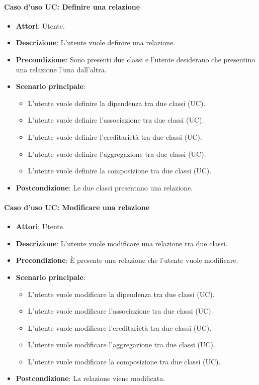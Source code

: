 \paragraph{Caso d'uso UC: Definire una relazione}
\begin{itemize}
	\item\textbf{Attori}: Utente.
	\item\textbf{Descrizione}: L'utente vuole definire una relazione.
	\item\textbf{Precondizione}: Sono presenti due classi e l'utente desiderano che presentino una relazione l'una dall'altra.
	\item\textbf{Scenario principale}: 
		\begin{itemize}
			\item L'utente vuole definire la dipendenza tra due classi (UC).
			\item L'utente vuole definire l'associazione tra due classi (UC).
			\item L'utente vuole definire l'ereditarietà tra due classi (UC).
			\item L'utente vuole definire l'aggregazione tra due classi (UC).
			\item L'utente vuole definire la composizione tra due classi (UC).
		\end{itemize}
	\item\textbf{Postcondizione}: Le due classi presentano una relazione.
	
\end{itemize}

\paragraph{Caso d'uso UC: Modificare una relazione}
\begin{itemize}
	\item\textbf{Attori}: Utente.
	\item\textbf{Descrizione}: L'utente vuole modificare una relazione tra due classi.
	\item\textbf{Precondizione}: È presente una relazione che l'utente vuole modificare.
	\item\textbf{Scenario principale}: 
		\begin{itemize}
			\item L'utente vuole modificare la dipendenza tra due classi (UC).
			\item L'utente vuole modificare l'associazione tra due classi (UC).
			\item L'utente vuole modificare l'ereditarietà tra due classi (UC).
			\item L'utente vuole modificare l'aggregazione tra due classi (UC).
			\item L'utente vuole modificare la composizione tra due classi (UC).
		\end{itemize}
	\item\textbf{Postcondizione}: La relazione viene modificata.
\end{itemize}

